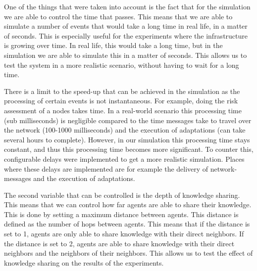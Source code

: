 
One of the things that were taken into account is the fact that for the simulation we are able to control the time that passes. This means that we are able to simulate a number of events that would take a long time in real life, in a matter of seconds. This is especially useful for the experiments where the infrastructure is growing over time. In real life, this would take a long time, but in the simulation we are able to simulate this in a matter of seconds. This allows us to test the system in a more realistic scenario, without having to wait for a long time.

There is a limit to the speed-up that can be achieved in the simulation as the processing of certain events is not instantaneous. For example, doing the risk assessment of a nodes takes time. In a real-world scenario this processing time (sub milliseconds) is negligible compared to the time messages take to travel over the network (100-1000 milliseconds) and the execution of adaptations (can take several hours to complete). However, in our simulation this processing time stays constant, and thus this processing time becomes more significant. To counter this, configurable delays were implemented to get a more realistic simulation. 
Places where these delays are implemented are for example the delivery of network-messages and the execution of adaptations. 

The second variable that can be controlled is the depth of knowledge sharing. This means that we can control how far agents are able to share their knowledge. This is done by setting a maximum distance between agents. This distance is defined as the number of hops between agents. This means that if the distance is set to 1, agents are only able to share knowledge with their direct neighbors. If the distance is set to 2, agents are able to share knowledge with their direct neighbors and the neighbors of their neighbors. This allows us to test the effect of knowledge sharing on the results of the experiments.



